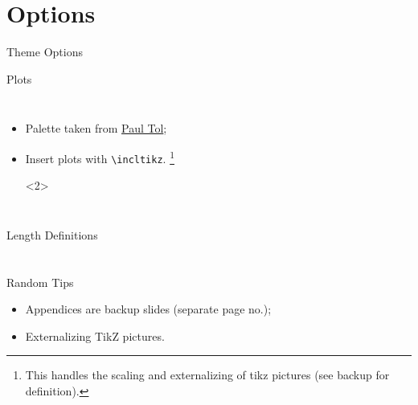 \documentclass[t]{beamer}
\begin{document}
\section{Options}
\begin{frame}{Theme Options}
\end{frame}

\begin{frame}[fragile]{Plots}
  \begin{columns}[T]
    \begin{itemize}
      \item Palette taken from \href{https://personal.sron.nl/~pault/#sec:qualitative}{Paul Tol};
      \item <2-> Insert plots with \texttt{\textbackslash{}incltikz}.%
        \footnote{This handles the scaling and externalizing of tikz pictures (see backup for definition).}%
        \begin{onlyenv}<2>
        \begin{dotlst}[title={Example plot}]
        \end{dotlst}
      \end{onlyenv}
    \end{itemize}
  \end{columns}
\end{frame}

\begin{frame}{Length Definitions}
\end{frame}

\appendix
\section*{}

\begin{frame}[fragile]{Random Tips}
\begin{itemize}
  \item Appendices are backup slides (separate page no.);
  \item Externalizing TikZ pictures.%
  \begin{dotlst}[%
    listing side comment,righthand ratio=0.35,comment={\incltikz{onsager}}
    ]
\usepackage{tikz}
\usetikzlibrary{external}
\tikzexternalize[%
  prefix=build/,only named=true]
\newcommand{\inptikz}[2][]{%
  \tikzsetnextfilename{#2}%
  \texttt{[image: tikz/\#2.tikz]}%
}
  \end{dotlst}
\end{itemize}
\end{frame}
\end{document}
